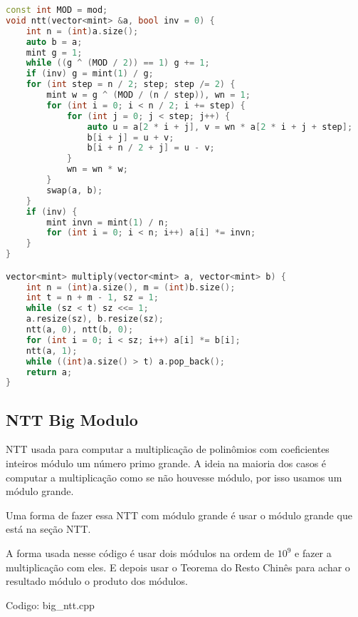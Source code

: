 \documentclass[10pt, a4paper, oneside]{book}
\begin{document}
\begin{lstlisting}[language=C++]
const int MOD = mod;
void ntt(vector<mint> &a, bool inv = 0) {
    int n = (int)a.size();
    auto b = a;
    mint g = 1;
    while ((g ^ (MOD / 2)) == 1) g += 1;
    if (inv) g = mint(1) / g;
    for (int step = n / 2; step; step /= 2) {
        mint w = g ^ (MOD / (n / step)), wn = 1;
        for (int i = 0; i < n / 2; i += step) {
            for (int j = 0; j < step; j++) {
                auto u = a[2 * i + j], v = wn * a[2 * i + j + step];
                b[i + j] = u + v;
                b[i + n / 2 + j] = u - v;
            }
            wn = wn * w;
        }
        swap(a, b);
    }
    if (inv) {
        mint invn = mint(1) / n;
        for (int i = 0; i < n; i++) a[i] *= invn;
    }
}

vector<mint> multiply(vector<mint> a, vector<mint> b) {
    int n = (int)a.size(), m = (int)b.size();
    int t = n + m - 1, sz = 1;
    while (sz < t) sz <<= 1;
    a.resize(sz), b.resize(sz);
    ntt(a, 0), ntt(b, 0);
    for (int i = 0; i < sz; i++) a[i] *= b[i];
    ntt(a, 1);
    while ((int)a.size() > t) a.pop_back();
    return a;
}
\end{lstlisting}
\hfill

\subsection{NTT Big Modulo}


NTT usada para computar a multiplicação de polinômios com coeficientes inteiros módulo um número primo grande. A ideia na maioria dos casos é computar a multiplicação como se não houvesse módulo, por isso usamos um módulo grande.



Uma forma de fazer essa NTT com módulo grande é usar o módulo grande que está na seção NTT.



A forma usada nesse código é usar dois módulos na ordem de $10^9$ e fazer a multiplicação com eles. E depois usar o Teorema do Resto Chinês para achar o resultado módulo o produto dos módulos.
\hfill

Codigo: big\_ntt.cpp
\end{document}
